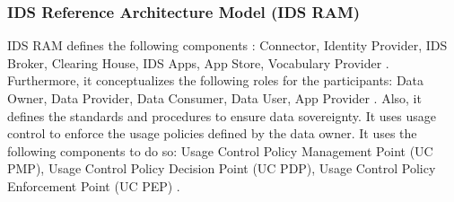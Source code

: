 \subsubsection{IDS Reference Architecture Model (IDS RAM)}
IDS RAM defines the following components \cite{otto_ids_2019}:
Connector, Identity Provider, IDS Broker, Clearing House, IDS Apps, App Store, Vocabulary Provider \cite{pettenpohl_international_2022}.
Furthermore, it conceptualizes the following roles for the participants:
Data Owner, Data Provider, Data Consumer, Data User, App Provider
\cite{pettenpohl_international_2022}.
Also, it defines the standards and procedures to ensure data sovereignty. It uses usage control to enforce the usage policies defined by the data owner. It uses the following components to do so: Usage Control Policy Management Point (UC PMP), Usage Control Policy Decision Point (UC PDP), Usage Control Policy Enforcement Point (UC PEP) \cite{otto_evolution_2022}.
